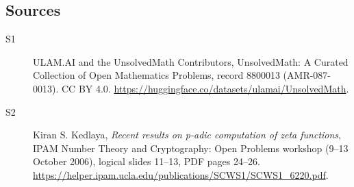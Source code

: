 \documentclass[11pt]{article}
\begin{document}
\subsection{Sources}
\begin{description}
\item[\hypertarget{source:8800013:1}{S1}] ULAM.AI and the UnsolvedMath Contributors, UnsolvedMath: A Curated Collection of Open Mathematics Problems, record 8800013 (AMR-087-0013). CC BY 4.0. \url{https://huggingface.co/datasets/ulamai/UnsolvedMath}.
\item[\hypertarget{source:8800013:2}{S2}] Kiran S. Kedlaya, \emph{Recent results on p-adic computation of zeta functions}, IPAM Number Theory and Cryptography: Open Problems workshop (9--13 October 2006), logical slides 11--13, PDF pages 24--26. \url{https://helper.ipam.ucla.edu/publications/SCWS1/SCWS1_6220.pdf}.
\end{description}
\label{end:8800013}
\end{document}
